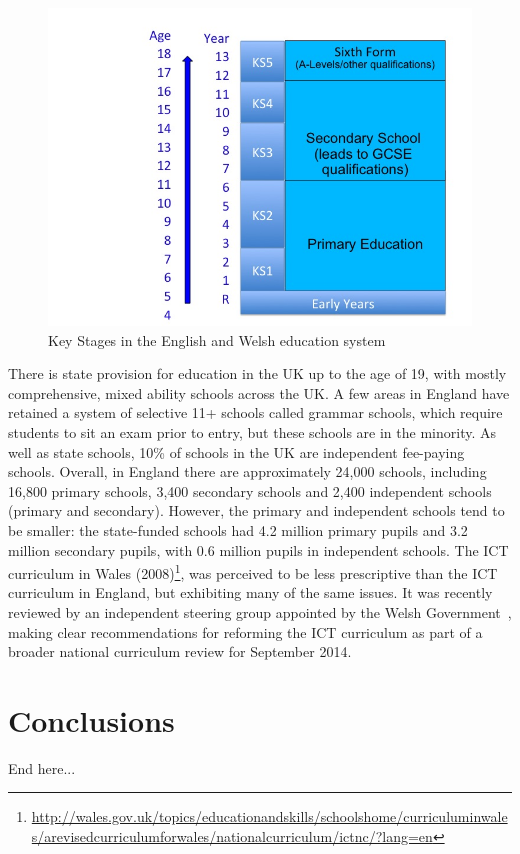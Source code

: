 \documentclass{sig-alternate}
\begin{document}
\begin{figure}
  \centering
  \includegraphics[width=\columnwidth]{images/key-stages.png}
  \caption{Key Stages in the English and Welsh education system}
  \label{fig:key-stages}
\end{figure}

There is state provision for education in the UK up to the age of 19,
with mostly comprehensive, mixed ability schools across the UK. A few
areas in England have retained a system of selective 11+ schools
called grammar schools, which require students to sit an exam prior to
entry, but these schools are in the minority. As well as state
schools, 10\% of schools in the UK are independent fee-paying
schools. Overall, in England there are approximately 24,000 schools,
including 16,800 primary schools, 3,400 secondary schools and 2,400
independent schools (primary and secondary).  However, the primary and
independent schools tend to be smaller: the state-funded schools had
4.2 million primary pupils and 3.2 million secondary pupils, with 0.6
million pupils in independent schools. The ICT
curriculum in Wales
(2008)\footnote{\url{http://wales.gov.uk/topics/educationandskills/schoolshome/curriculuminwales/arevisedcurriculumforwales/nationalcurriculum/ictnc/?lang=en}},
was perceived to be less prescriptive than the ICT curriculum in
England, but exhibiting many of the same issues. It was recently
reviewed by an independent steering group appointed by the Welsh
Government~\cite{welshictreview:2013}, making clear recommendations for
reforming the ICT curriculum as part of a broader national curriculum
review for September 2014.

\section{Conclusions}
End here...




\end{document}

